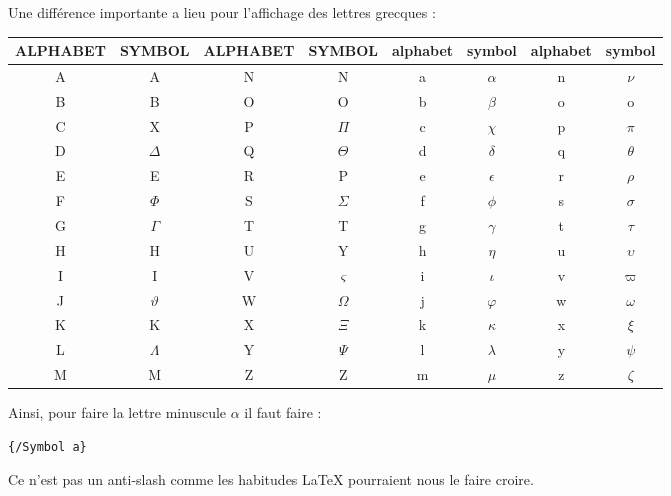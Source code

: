 \documentclass[a4paper,twoside]{article}
\begin{document}
\bigskip

Une différence importante a lieu pour l'affichage des lettres grecques : 
\begin{center}
\begin{tabular}{*{4}{|c|c|}}
\hline
ALPHABET  & SYMBOL  & ALPHABET  & SYMBOL  & alphabet  & symbol  & alphabet  & symbol \\\hline\hline
A  & A  & N  & N  & a  & $\alpha$  & n  & $\nu$\\\hline
B  & B  & O  & O  & b  & $\beta$  & o  & o\\\hline
C  & X  & P  & $\Pi$  & c  & $\chi$  & p  & $\pi$\\\hline
D  & $\Delta$  & Q  & $\Theta$  & d  & $\delta$  & q  & $\theta$\\\hline
E  & E  & R  & P  & e  & $\epsilon$  & r  & $\rho$\\\hline
F  & $\Phi$  & S  & $\Sigma$  & f  & $\phi$  & s  & $\sigma$\\\hline
G  & $\Gamma$  & T  & T  & g  & $\gamma$  & t  & $\tau$\\\hline
H  & H  & U  & Y  & h  & $\eta$  & u  & $\upsilon$\\\hline
I  & I  & V  & $\varsigma$  & i  & $\iota$  & v & $\varpi$\\\hline
J & $\vartheta$ & W  & $\Omega$ & j & $\varphi$ & w  & $\omega$\\\hline
K  & K  & X  & $\Xi$  & k  & $\kappa$  & x  & $\xi$\\\hline
L  & $\Lambda$  & Y  & $\Psi$  & l  & $\lambda$  & y  & $\psi$\\\hline
M  & M  & Z  & Z  & m  & $\mu$  & z  & $\zeta $\\\hline
\end{tabular}
\end{center}

Ainsi, pour faire la lettre minuscule $\alpha$ il faut faire : 
\begin{verbatim}
{/Symbol a}
\end{verbatim}

\begin{attention}
Ce n'est pas un anti-slash comme les habitudes \LaTeX{} pourraient nous le faire croire.
\end{attention}




\printindex
\end{document}
